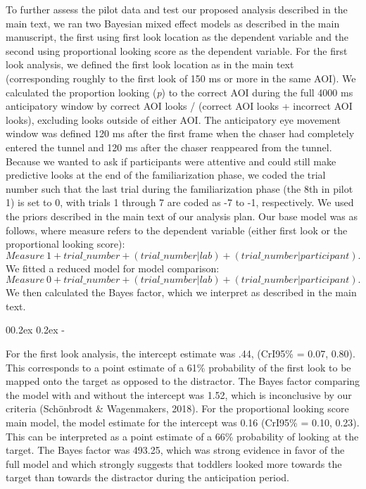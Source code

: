 \documentclass[
  man, donotrepeattitle,floatsintext]{apa6}
\makeatletter
\let\oldsubparagraph\subparagraph
\renewcommand{\subparagraph}{
    \@ifstar
      \xxxSubParagraphStar
      \xxxSubParagraphNoStar
  }
\newcommand{\xxxSubParagraphStar}[1]{\oldsubparagraph*{#1}\mbox{}}
\newcommand{\xxxSubParagraphNoStar}[1]{\oldsubparagraph{#1}\mbox{}}
\renewcommand{\subparagraph}[1]{\@startsection{subparagraph}{5}{1em}%
  {0\baselineskip \@plus 0.2ex \@minus 0.2ex}%
  {-\z@\relax}%
  {\normalfont\normalsize\itshape\hspace{\parindent}{#1}\textit{\addperi}}{\relax}}
\makeatother
\begin{document}
To further assess the pilot data and test our proposed analysis described in the main text, we ran two Bayesian mixed effect models as described in the main manuscript, the first using first look location as the dependent variable and the second using proportional looking score as the dependent variable. For the first look analysis, we defined the first look location as in the main text (corresponding roughly to the first look of 150 ms or more in the same AOI). We calculated the proportion looking (\emph{p}) to the correct AOI during the full 4000 ms anticipatory window by correct AOI looks / (correct AOI looks + incorrect AOI looks), excluding looks outside of either AOI. The anticipatory eye movement window was defined 120 ms after the first frame when the chaser had completely entered the tunnel and 120 ms after the chaser reappeared from the tunnel.\\
Because we wanted to ask if participants were attentive and could still make predictive looks at the end of the familiarization phase, we coded the trial number such that the last trial during the familiarization phase (the 8th in pilot 1) is set to 0, with trials 1 through 7 are coded as -7 to -1, respectively. We used the priors described in the main text of our analysis plan. Our base model was as follows, where measure refers to the dependent variable (either first look or the proportional looking score):\\
\(Measure ~ 1 + trial\_number + (trial\_number | lab) + (trial\_number | participant).\)
We fitted a reduced model for model comparison:
\(Measure  ~ 0 + trial\_number + ( trial\_number | lab) + (trial\_number | participant).\)
We then calculated the Bayes factor, which we interpret as described in the main text.

\subparagraph{Toddlers.}\label{toddlers.}

For the first look analysis, the intercept estimate was .44, (CrI95\% = 0.07, 0.80). This corresponds to a point estimate of a 61\% probability of the first look to be mapped onto the target as opposed to the distractor. The Bayes factor comparing the model with and without the intercept was 1.52, which is inconclusive by our criteria (Schönbrodt \& Wagenmakers, 2018). For the proportional looking score main model, the model estimate for the intercept was 0.16 (CrI95\% = 0.10, 0.23). This can be interpreted as a point estimate of a 66\% probability of looking at the target. The Bayes factor was 493.25, which was strong evidence in favor of the full model and which strongly suggests that toddlers looked more towards the target than towards the distractor during the anticipation period.
\end{document}
